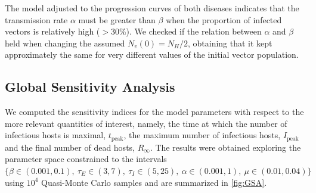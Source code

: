 The model adjusted to the progression curves of both diseases indicates
that the transmission rate $\alpha$ must be greater than $\beta$ when the
proportion of infected vectors is relatively high ($>30\%$). We checked if the
relation between $\alpha$ and $\beta$ held when changing the assumed
$N_v(0)=N_H/2$, obtaining that it kept approximately the same for very
different values of the initial vector population.

\subsection{Global Sensitivity Analysis}

We computed the sensitivity indices for the model parameters with respect
to the more relevant quantities of interest, namely, the time at which the
number of infectious hosts is maximal, $t_{\textrm{peak}}$, the maximum number
of infectious hosts, $I_{\textrm{peak}}$ and the final number of dead hosts,
$R_\infty$. The results were obtained exploring the parameter space constrained
to the intervals $\{\beta\in(0.001, 0.1), \ \tau_E\in(3,7), \ \tau_I\in(5,25),
    \ \alpha\in(0.001, 1), \ \mu\in(0.01, 0.04)\}$ using $10^4$ Quasi-Monte
Carlo
samples and are summarized in \cref{fig:GSA}.

